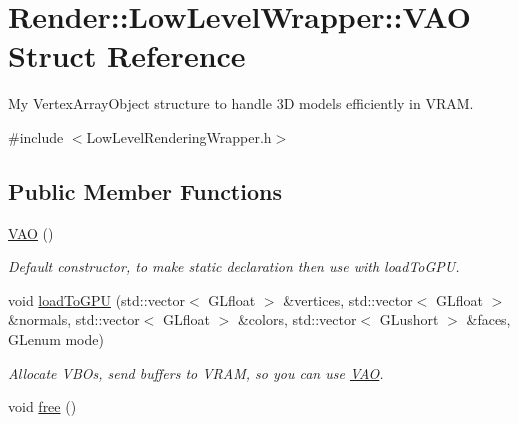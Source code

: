 \hypertarget{struct_render_1_1_low_level_wrapper_1_1_v_a_o}{}\section{Render\+:\+:Low\+Level\+Wrapper\+:\+:V\+AO Struct Reference}
\label{struct_render_1_1_low_level_wrapper_1_1_v_a_o}


My Vertex\+Array\+Object structure to handle 3D models efficiently in V\+R\+AM.  




{\ttfamily \#include $<$Low\+Level\+Rendering\+Wrapper.\+h$>$}

\subsection*{Public Member Functions}
\begin{DoxyCompactItemize}
\item 
\hyperlink{struct_render_1_1_low_level_wrapper_1_1_v_a_o_a40006283ef923063313360481ba3fbd0}{V\+AO} ()
\begin{DoxyCompactList}\small\item\em Default constructor, to make static declaration then use with load\+To\+G\+PU. \end{DoxyCompactList}\item 
void \hyperlink{struct_render_1_1_low_level_wrapper_1_1_v_a_o_a0086d3f8182900069ae1a55527dc8364}{load\+To\+G\+PU} (std\+::vector$<$ G\+Lfloat $>$ \&vertices, std\+::vector$<$ G\+Lfloat $>$ \&normals, std\+::vector$<$ G\+Lfloat $>$ \&colors, std\+::vector$<$ G\+Lushort $>$ \&faces, G\+Lenum mode)
\begin{DoxyCompactList}\small\item\em Allocate V\+B\+Os, send buffers to V\+R\+AM, so you can use \hyperlink{struct_render_1_1_low_level_wrapper_1_1_v_a_o}{V\+AO}. \end{DoxyCompactList}\item 
void \hyperlink{struct_render_1_1_low_level_wrapper_1_1_v_a_o_a3f973d7175d6f6a5dc33ca2e9d15c2fa}{free} ()
\end{DoxyCompactItemize}
